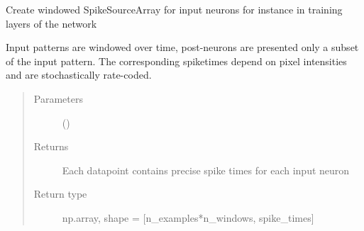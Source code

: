 \documentclass[letterpaper,10pt,english]{sphinxmanual}
\begin{document}
\begin{fulllineitems}
\label{\detokenize{SpikingConvNet:SpikingConvNet.algorithms.input_windowed_spikes}}
Create windowed SpikeSourceArray for input neurons
for instance in training layers of the network

Input patterns are windowed over time, post-neurons are presented only
a subset of the input pattern. The corresponding spiketimes depend on
pixel intensities and are stochastically rate-coded.
\begin{quote}\begin{description}
\item[{Parameters}] \leavevmode
{} ()

\item[{Returns}] \leavevmode
{} \textendash{} Each datapoint contains precise spike times for each input neuron

\item[{Return type}] \leavevmode
np.array, shape = {[}n\_examples*n\_windows, spike\_times{]}

\end{description}\end{quote}

\end{fulllineitems}

\end{document}
